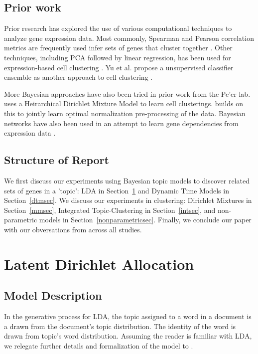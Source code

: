 \documentclass{article}
\begin{document}
\subsection{Prior work}
Prior research has explored the use of various computational techniques to analyze gene expression data. Most commonly, Spearman and Pearson correlation metrics are frequently used infer sets of genes that cluster together \cite{profiling, nature}. Other techniques, including PCA followed by linear regression, has been used for expression-based cell clustering \cite{transcriptomics}. Yu et al. propose a unsupervised classifier ensemble as another approach to cell clustering \cite{consensus}. 

More Bayesian approaches have also been tried in prior work from the Pe'er lab. \cite{bayesge2} uses a Heirarchical Dirichlet Mixture Model to learn cell clusterings. \cite{bayesge1} builds on this to jointly learn optimal normalization pre-processing of the data. Bayesian networks have also been used in an attempt to learn gene dependencies from expression data \cite{bayesge3}.

\subsection{Structure of Report}
    We first discuss our experiments using Bayesian topic models to discover related sets of genes in a 'topic': LDA in Section~\ref{ldasec} and Dynamic Time Models in Section~\ref{dtmsec}. We discuss our experiments in clustering: Dirichlet Mixtures in Section~\ref{mmsec}, Integrated Topic-Clustering in Section~\ref{intsec}, and non-parametric models in Section~\ref{nonparametricsec}. Finally, we conclude our paper with our obversations from across all studies. 

\section{Latent Dirichlet Allocation} 
\label{ldasec}
\subsection{Model Description} 
In the generative process for LDA, the topic assigned to a word in a document is a drawn from the document's topic distribution. The identity of the word is drawn from topic's word distribution. Assuming the reader is familiar with LDA, we relegate further details and formalization of the model to \cite{LDA}.
\end{document}
